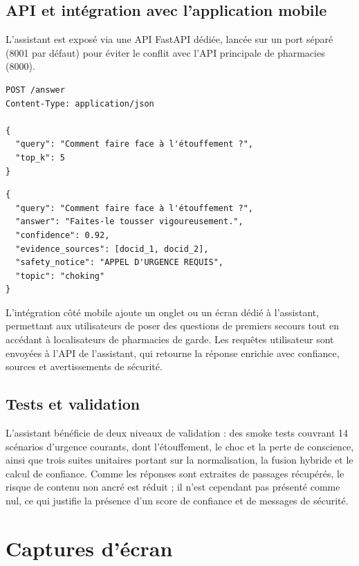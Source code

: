 \subsection{API et intégration avec l'application mobile}

L'assistant est exposé via une API FastAPI dédiée, lancée sur un port séparé (8001 par défaut) pour éviter
le conflit avec l'API principale de pharmacies (8000).

\begin{lstlisting}[caption={Exemple de requête à l'API de l'assistant}]
POST /answer
Content-Type: application/json

{
  "query": "Comment faire face à l'étouffement ?",
  "top_k": 5
}
\end{lstlisting}

\begin{lstlisting}[caption={Structure de la réponse de l'assistant}]
{
  "query": "Comment faire face à l'étouffement ?",
  "answer": "Faites-le tousser vigoureusement.",
  "confidence": 0.92,
  "evidence_sources": [docid_1, docid_2],
  "safety_notice": "APPEL D'URGENCE REQUIS",
  "topic": "choking"
}
\end{lstlisting}

L'intégration côté mobile ajoute un onglet ou un écran dédié à l'assistant, permettant aux utilisateurs de
poser des questions de premiers secours tout en accédant à localisateurs de pharmacies de garde. Les
requêtes utilisateur sont envoyées à l'API de l'assistant, qui retourne la réponse enrichie avec confiance,
sources et avertissements de sécurité.

\subsection{Tests et validation}

L'assistant bénéficie de deux niveaux de validation : des smoke tests couvrant 14 scénarios d'urgence
courants, dont l'étouffement, le choc et la perte de conscience, ainsi que trois suites unitaires portant
sur la normalisation, la fusion hybride et le calcul de confiance. Comme les réponses sont extraites de
passages récupérés, le risque de contenu non ancré est réduit ; il n'est cependant pas présenté comme nul,
ce qui justifie la présence d'un score de confiance et de messages de sécurité.

\section{Captures d'écran}

